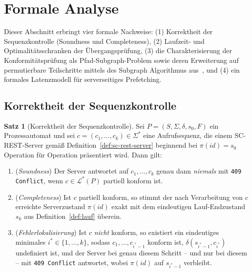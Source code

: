 ﻿\documentclass[a4paper,12pt]{article}
\theoremstyle{definition}
\newtheorem{satz}{Satz}
\begin{document}
\section{Formale Analyse}
\label{sec:analyse}

Dieser Abschnitt erbringt vier formale Nachweise: (1) Korrektheit der Sequenzkontrolle
(Soundness und Completeness), (2) Laufzeit- und Optimalitätsschranken der
Übergangsprüfung, (3) die Charakterisierung der Konformitätsprüfung als
Pfad-Subgraph-Problem sowie deren Erweiterung auf permutierbare Teilschritte mittels des
Subgraph Algorithmus aus~\cite{epp2026subgraph}, und (4) ein formales Latenzmodell für
serverseitiges Prefetching.

\subsection{Korrektheit der Sequenzkontrolle}

\begin{satz}[Korrektheit der Sequenzkontrolle]
	\label{satz:korrektheit}
	Sei $P=(S,\Sigma,\delta,s_0,F)$ ein Prozessautomat und sei
	$c=(c_1,\ldots,c_k)\in\Sigma^*$ eine Aufrufsequenz, die einem SC-REST-Server gemäß
	Definition~\ref{def:sc-rest-server} beginnend bei $\pi(id)=s_0$ Operation für
	Operation präsentiert wird. Dann gilt:
	\begin{enumerate}
		\item[(a)] (\emph{Soundness}) Der Server antwortet auf $c_1,\ldots,c_k$ genau dann
		      \emph{niemals} mit \texttt{409 Conflict}, wenn $c \in \mathcal{L}^*(P)$
		      partiell konform ist.
		\item[(b)] (\emph{Completeness}) Ist $c$ partiell konform, so stimmt der nach
		      Verarbeitung von $c$ erreichte Serverzustand $\pi(id)$ exakt mit dem
		      eindeutigen Lauf-Endzustand $s_k$ aus Definition~\ref{def:lauf} überein.
		\item[(c)] (\emph{Fehlerlokalisierung}) Ist $c$ \emph{nicht} konform, so existiert
		      ein eindeutiges minimales $i^\ast \in \{1,\ldots,k\}$, sodass
		      $c_1,\ldots,c_{i^\ast-1}$ konform ist, $\delta(s_{i^\ast-1},c_{i^\ast})$
		      undefiniert ist, und der Server bei genau diesem Schritt -- und nur bei
		      diesem -- mit \texttt{409 Conflict} antwortet, wobei $\pi(id)$ auf
		      $s_{i^\ast-1}$ verbleibt.
	\end{enumerate}
\end{satz}
\end{document}
